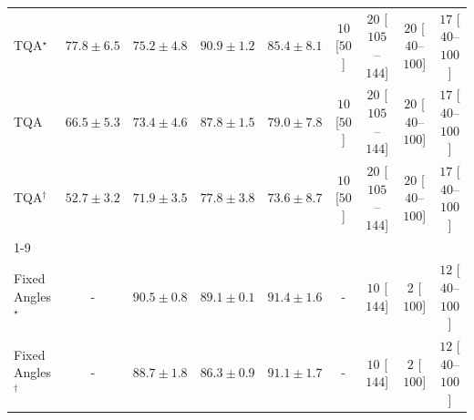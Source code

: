 \begin{tabular}{l|cccc|cccc|}
TQA$^\star$ & {\cellcolor[HTML]{F17C1A}} \color[HTML]{F1F1F1} $77.8\pm 6.5$ & {\cellcolor[HTML]{FA8F24}} \color[HTML]{F1F1F1} $75.2\pm 4.8$ & {\cellcolor[HTML]{903104}} \color[HTML]{F1F1F1} $90.9\pm 1.2$ & {\cellcolor[HTML]{C44802}} \color[HTML]{F1F1F1} $85.4\pm 8.1$ & {\cellcolor[HTML]{FFF6F2}} \color[HTML]{000000} $10$ [$50$] & {\cellcolor[HTML]{FFF3F0}} \color[HTML]{000000} $20$ [$105$--$144$] & {\cellcolor[HTML]{FFF3F0}} \color[HTML]{000000} $20$ [$40$--$100$] & {\cellcolor[HTML]{FFF4F0}} \color[HTML]{000000} $17$ [$40$--$100$] \\
TQA & {\cellcolor[HTML]{FED16B}} \color[HTML]{000000} $66.5\pm 5.3$ & {\cellcolor[HTML]{FE9E2D}} \color[HTML]{000000} $73.4\pm 4.6$ & {\cellcolor[HTML]{AE3E03}} \color[HTML]{F1F1F1} $87.8\pm 1.5$ & {\cellcolor[HTML]{ED7215}} \color[HTML]{F1F1F1} $79.0\pm 7.8$ & {\cellcolor[HTML]{FFF6F2}} \color[HTML]{000000} $10$ [$50$] & {\cellcolor[HTML]{FFF3F0}} \color[HTML]{000000} $20$ [$105$--$144$] & {\cellcolor[HTML]{FFF3F0}} \color[HTML]{000000} $20$ [$40$--$100$] & {\cellcolor[HTML]{FFF4F0}} \color[HTML]{000000} $17$ [$40$--$100$] \\
TQA$^\dagger$ & {\cellcolor[HTML]{FFFFE5}} \color[HTML]{000000} $52.7\pm 3.2$ & {\cellcolor[HTML]{FEAA38}} \color[HTML]{000000} $71.9\pm 3.5$ & {\cellcolor[HTML]{F17C1A}} \color[HTML]{F1F1F1} $77.8\pm 3.8$ & {\cellcolor[HTML]{FE9C2C}} \color[HTML]{000000} $73.6\pm 8.7$ & {\cellcolor[HTML]{FFF6F2}} \color[HTML]{000000} $10$ [$50$] & {\cellcolor[HTML]{FFF3F0}} \color[HTML]{000000} $20$ [$105$--$144$] & {\cellcolor[HTML]{FFF3F0}} \color[HTML]{000000} $20$ [$40$--$100$] & {\cellcolor[HTML]{FFF4F0}} \color[HTML]{000000} $17$ [$40$--$100$] \\
\cline{1-9}
\multicolumn{9}{c}{\rule{0pt}{8pt}PP} \\
\midrule
Fixed Angles$^\star$ & {\cellcolor[HTML]{000000}} \color[HTML]{F1F1F1} {\cellcolor{white}} \color{black} - & {\cellcolor[HTML]{006435}} \color[HTML]{F1F1F1} $90.5\pm 0.8$ & {\cellcolor[HTML]{066D39}} \color[HTML]{F1F1F1} $89.1\pm 0.1$ & {\cellcolor[HTML]{005E33}} \color[HTML]{F1F1F1} $91.4\pm 1.6$ & {\cellcolor[HTML]{000000}} \color[HTML]{F1F1F1} {\cellcolor{white}} \color{black} - & {\cellcolor[HTML]{FFF6F2}} \color[HTML]{000000} $10$ [$144$] & {\cellcolor[HTML]{FFF7F3}} \color[HTML]{000000} $2$ [$100$] & {\cellcolor[HTML]{FFF5F1}} \color[HTML]{000000} $12$ [$40$--$100$] \\
Fixed Angles$^\dagger$ & {\cellcolor[HTML]{000000}} \color[HTML]{F1F1F1} {\cellcolor{white}} \color{black} - & {\cellcolor[HTML]{086E3A}} \color[HTML]{F1F1F1} $88.7\pm 1.8$ & {\cellcolor[HTML]{187B3F}} \color[HTML]{F1F1F1} $86.3\pm 0.9$ & {\cellcolor[HTML]{006034}} \color[HTML]{F1F1F1} $91.1\pm 1.7$ & {\cellcolor[HTML]{000000}} \color[HTML]{F1F1F1} {\cellcolor{white}} \color{black} - & {\cellcolor[HTML]{FFF6F2}} \color[HTML]{000000} $10$ [$144$] & {\cellcolor[HTML]{FFF7F3}} \color[HTML]{000000} $2$ [$100$] & {\cellcolor[HTML]{FFF5F1}} \color[HTML]{000000} $12$ [$40$--$100$] \\

\end{tabular}
